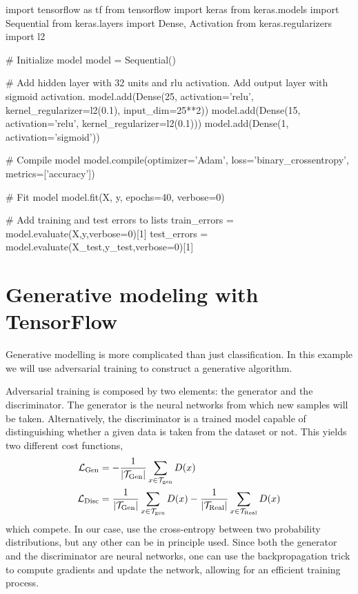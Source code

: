 \documentclass[]{report}
\begin{document}
\begin{boxedverbatim}
import tensorflow as tf
from tensorflow import keras
from keras.models import Sequential
from keras.layers import Dense, Activation
from keras.regularizers import l2

# Initialize model
model = Sequential()

# Add hidden layer with 32 units and rlu activation. Add output layer with sigmoid activation.
model.add(Dense(25, activation='relu', kernel_regularizer=l2(0.1), input_dim=25**2))
model.add(Dense(15, activation='relu', kernel_regularizer=l2(0.1)))
model.add(Dense(1, activation='sigmoid'))

# Compile model
model.compile(optimizer='Adam', loss='binary_crossentropy', metrics=['accuracy'])

# Fit model
model.fit(X, y, epochs=40, verbose=0)

# Add training and test errors to lists
train_errors = model.evaluate(X,y,verbose=0)[1]
test_errors = model.evaluate(X_test,y_test,verbose=0)[1] 
\end{boxedverbatim}
\vskip5mm

\section{Generative modeling with TensorFlow}

Generative modelling is more complicated than just classification. In this example we will use adversarial training to construct a generative algorithm. 

Adversarial training is composed by two elements: the generator and the discriminator. The generator is the neural networks from which new samples will be taken. Alternatively, the discriminator is a trained model capable of distinguishing whether a given data is taken from the dataset or not. This yields two different cost functions,
\begin{align}
\mathcal L_{\rm Gen} & = -\frac{1}{\vert \mathcal T_{\rm Gen} \vert}\sum_{x \in \mathcal T_{\rm gen}} D(x)\\
\mathcal L_{\rm Disc} & = \frac{1}{\vert \mathcal T_{\rm Gen} \vert}\sum_{x \in \mathcal T_{\rm gen}} D(x) - \frac{1}{\vert \mathcal T_{\rm Real} \vert}\sum_{x \in \mathcal T_{\rm Real}} D(x)
\end{align}
which compete. In our case, use the cross-entropy between two probability distributions, but any other can be in principle used. Since both the generator and the discriminator are neural networks, one can use the backpropagation trick to compute gradients and update the network, allowing for an efficient training process. 
\end{document}
